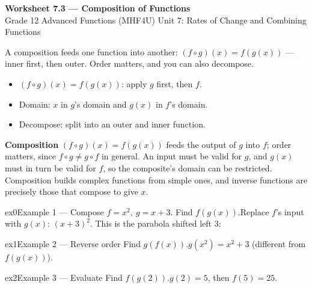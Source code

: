 \documentclass[11pt]{article}
\begin{document}
\begin{center}
{\LARGE\bfseries\color{titleblue}Worksheet 7.3 --- Composition of Functions}\\[2pt]
{\small Grade 12 Advanced Functions (MHF4U) \textperiodcentered{} Unit 7: Rates of Change and Combining Functions}
\end{center}

\begin{ideabox}
A composition feeds one function into another: $(f\circ g)(x)=f(g(x))$ — inner first, then outer. Order matters, and you can also decompose.
\begin{itemize}[leftmargin=*,itemsep=2pt]
  \item $(f\circ g)(x)=f(g(x))$: apply $g$ first, then $f$.
  \item Domain: $x$ in $g$'s domain and $g(x)$ in $f$'s domain.
  \item Decompose: split into an outer and inner function.
\end{itemize}
\end{ideabox}

\begin{learnbox}
\textbf{Composition} $(f\circ g)(x)=f(g(x))$ feeds the output of $g$ into $f$; order matters, since $f\circ g\ne g\circ f$ in general.
An input must be valid for $g$, and $g(x)$ must in turn be valid for $f$, so the composite's domain can be restricted.
Composition builds complex functions from simple ones, and inverse functions are precisely those that compose to give $x$.
\end{learnbox}


\begin{example}{ex0}{Example 1 --- Compose}
$f=x^2,\ g=x+3$. Find $f(g(x))$.\soln Replace $f$'s input with $g(x)$: $(x+3)^2$. This is the parabola shifted left 3:
\end{example}

\begin{example}{ex1}{Example 2 --- Reverse order}
Find $g(f(x))$.\soln $g(x^2)=x^2+3$ (different from $f(g(x))$).
\end{example}

\begin{example}{ex2}{Example 3 --- Evaluate}
Find $f(g(2))$.\soln $g(2)=5$, then $f(5)=25$.
\end{example}
\end{document}
